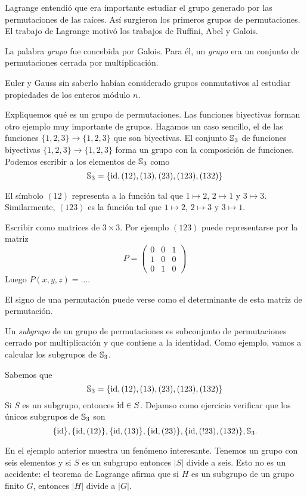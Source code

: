 Lagrange entendió que era importante estudiar el grupo generado por las
permutaciones de las raíces. Así surgieron los primeros 
grupos de permutaciones. 
El trabajo de Lagrange motivó los trabajos de Ruffini, Abel y Galois. 

La palabra
\emph{grupo} fue concebida por Galois. Para él, un \emph{grupo} era un
conjunto de permutaciones cerrada por multiplicación. 

Euler y Gauss sin saberlo habían considerado grupos conmutativos 
al estudiar propiedades de los enteros módulo $n$. 

Expliquemos qué es un grupo de permutaciones. 
Las funciones biyectivas forman otro ejemplo muy importante de grupos. Hagamos un caso sencillo, el de las funciones 
$\{1,2,3\}\to\{1,2,3\}$ que son biyectivas. El conjunto $\mathbb{S}_3$ de funciones
biyectivas $\{1,2,3\}\to\{1,2,3\}$ forma un grupo con la composición de funciones. Podemos escribir
a los elementos de $\mathbb{S}_3$ como
\[
	\mathbb{S}_3=\{\operatorname{id},(12),(13),(23),(123),(132)\}
\]

El símbolo $(12)$ representa a la función tal que $1\mapsto 2$, $2\mapsto 1$ y $3\mapsto 3$. Similarmente, $(123)$ es la función tal que $1\mapsto 2$, $2\mapsto 3$ y $3\mapsto 1$. 

Escribir como matrices de $3\times 3$. 
Por ejemplo
$(123)$ puede representarse por la matriz
\[
	P=\begin{pmatrix}
		0 & 0 & 1\\
		1 & 0 & 0\\
		0 & 1 & 0
	\end{pmatrix}
\]
Luego $P(x,y,z)=\dots$. 

El signo de una permutación puede verse como el determinante de esta matriz de permutación. 

Un \emph{subgrupo} de un grupo de permutaciones es subconjunto de permutaciones 
cerrado por multiplicación y 
que contiene a la identidad. Como ejemplo, vamos a calcular los subgrupos de $\mathbb{S}_3$.

\begin{example}
\label{exa:S3}
    Sabemos que 
    \[
	\mathbb{S}_3=\{\operatorname{id},(12),(13),(23),(123),(132)\}
    \]
    Si $S$ es un subgrupo, entonces $\operatorname{id}\in S$. Dejamso como ejercicio
    verificar que los únicos subgrupos de $\mathbb{S}_3$ son
    \[
    \{\operatorname{id}\},\{\operatorname{id},(12)\},\{\operatorname{id},(13)\},\{\operatorname{id},(23)\},\{\operatorname{id},(!23),(132)\},\mathbb{S}_3.
    \]
\end{example}

En el ejemplo anterior muestra un fenómeno interesante. Tenemos un grupo con seis
elementos y si $S$ es un subgrupo entonces $|S|$ divide a seis. Esto no es un accidente:  
el teorema de Lagrange afirma que si $H$ es un subgrupo de un grupo finito $G$,
entonces $|H|$ divide a $|G|$. 

